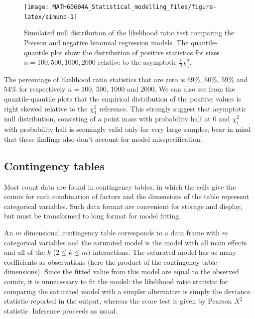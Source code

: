 \documentclass[
  11pt,
  letterpaper,
]{book}
\theoremstyle{definition}
\theoremstyle{definition}
\theoremstyle{definition}
\theoremstyle{definition}
\theoremstyle{remark}
\begin{document}
\begin{figure}

{\centering \texttt{[image: MATH60604A\_Statistical\_modelling\_files/figure-latex/simunb-1]} 

}

\caption{Simulated null distribution of the likelihood ratio test comparing the Poisson and negative binomial regression models. The quantile-quantile plot show the distribution of positive statistics for sizes $n=100, 500, 1000, 2000$ relative to the asymptotic $\frac{1}{2}\chi^2_1$.}\label{fig:simunb}
\end{figure}

The percentage of likelihood ratio statistics that are zero is \(69\)\%, \(60\)\%, \(59\)\% and \(54\)\% for respectively \(n=100\), \(500\), \(1000\) and \(2000\). We can also see from the quantile-quantile plots that the empirical distribution of the positive values is right skewed relative to the \(\chi^2_1\) reference. This strongly suggest that asymptotic null distribution, consisting of a point mass with probability half at \(0\) and \(\chi^2_1\) with probability half is seemingly valid only for very large samples; bear in mind that these findings also don't account for model misspecification.

\hypertarget{contingency-tables}{%
\subsection{Contingency tables}\label{contingency-tables}}

Most count data are found in contingency tables, in which the cells give the counts for each combination of factors and the dimensions of the table represent categorical variables. Such data format are convenient for storage and display, but must be transformed to long format for model fitting.

An \(m\) dimensional contingency table corresponds to a data frame with \(m\) categorical variables and the saturated model is the model with all main effects and all of the \(k\) (\(2 \leq k \leq m)\) interactions. The saturated model has as many coefficients as observations (here the product of the contingency table dimensions).
Since the fitted value from this model are equal to the observed counts, it is unnecessary to fit the model: the likelihood ratio statistic for comparing the saturated model with a simpler alternative is simply the deviance statistic reported in the output, whereas the score test is given by Pearson \(X^2\) statistic. Inference proceeds as usual.
\end{document}
